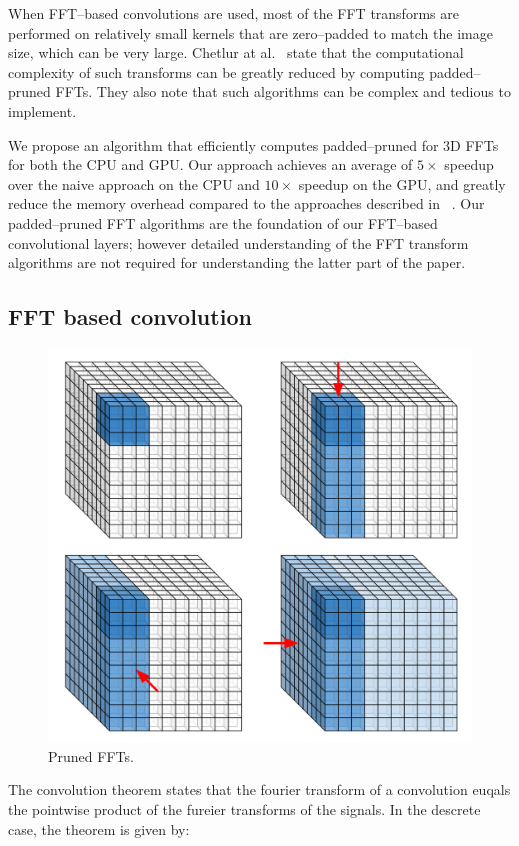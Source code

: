 \documentclass[conference]{IEEEtran}
\begin{document}
  When FFT--based convolutions are used, most of the FFT transforms
  are performed on relatively small kernels that are zero--padded to
  match the image size, which can be very large.  Chetlur at
  al.~\cite{chetlur2014cudnn} state that the computational complexity
  of such transforms can be greatly reduced by computing
  padded--pruned FFTs.  They also note that such algorithms can be
  complex and tedious to implement.

  We propose an algorithm that efficiently computes padded--pruned for
  3D FFTs for both the CPU and GPU. Our approach achieves an average
  of $5 \times$ speedup over the naive approach on the CPU and $10
  \times$ speedup on the GPU, and greatly reduce the memory overhead
  compared to the approaches described in
  ~\cite{mathieu-iclr-14,vasilache2014fast}.  Our padded--pruned FFT
  algorithms are the foundation of our FFT--based convolutional
  layers; however detailed understanding of the FFT transform
  algorithms are not required for understanding the latter part of the
  paper.

\subsection{FFT based convolution}

  \begin{figure}
    \begin{center}
      \includegraphics[width=0.55\columnwidth]{fig/pruned_ffts.pdf}
    \end{center}
    \caption{Pruned FFTs.}
    \label{fig:pruned_ffts}
  \end{figure}

  The convolution theorem states that the fourier transform of a
  convolution euqals the pointwise product of the fureier transforms
  of the signals.  In the descrete case, the theorem is given by:
\end{document}
